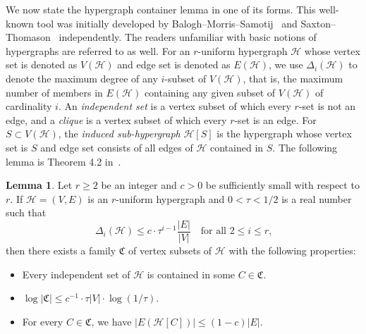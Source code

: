 \documentclass[11pt]{article}
\theoremstyle{definition}
\newtheorem{lemma}[theorem]{Lemma}
\begin{document}
We now state the hypergraph container lemma in one of its forms. This well-known tool was initially developed by Balogh--Morris--Samotij~\cite{balogh2015independent} and Saxton--Thomason~\cite{saxton2015hypergraph} independently. The readers unfamiliar with basic notions of hypergraphs are referred to \cite{balogh2015independent,saxton2015hypergraph} as well. For an $r$-uniform hypergraph $\mathcal{H}$ whose vertex set is denoted as $V(\mathcal{H})$ and edge set is denoted as $E(\mathcal{H})$, we use $\Delta_i(\mathcal{H})$ to denote the maximum degree of any $i$-subset of $V(\mathcal{H})$, that is, the maximum number of members in $E(\mathcal{H})$ containing any given subset of $V(\mathcal{H})$ of cardinality $i$. An \textit{independent set} is a vertex subset of which every $r$-set is not an edge, and a \textit{clique} is a vertex subset of which every $r$-set is an edge. For $S \subset V(\mathcal{H})$, the \textit{induced sub-hypergraph} $\mathcal{H}[S]$ is the hypergraph whose vertex set is $S$ and edge set consists of all edges of $\mathcal{H}$ contained in $S$. The following lemma is Theorem 4.2 in~\cite{morris2016534}.

\begin{lemma}\label{HCL}
Let $r \ge 2$ be an integer and $c>0$ be sufficiently small with respect to $r$. If $\mathcal{H}=(V,E)$ is an $r$-uniform hypergraph and $0<\tau<1/2$ is a real number such that \begin{equation*}
        \Delta_i(\mathcal{H}) \leq c \cdot \tau^{i-1} \frac{|E|}{|V|} \quad\text{for all $2\leq i\leq r$,}
\end{equation*} then there exists a family $\mathfrak{C}$ of vertex subsets of $\mathcal{H}$ with the following properties:
\begin{itemize}
            \item[(a)] Every independent set of $\mathcal{H}$ is contained in some $C \in \mathfrak{C}$.
            \item[(b)] $\log |\mathfrak{C}| \leq c^{-1} \cdot \tau |V| \cdot \log(1/\tau)$.
            \item[(c)] For every $C \in \mathfrak{C}$, we have $|E(\mathcal{H}[C])| \leq (1 - c)|E|$.
\end{itemize}
\end{lemma}
\end{document}
